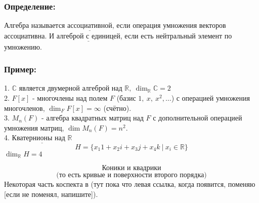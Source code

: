 \documentclass[12pt, letterpaper, twoside]{article}
\newcommand{\Underl}[1]{$\underline{\text{#1}}$}
\newcommand{\mb}[1]{\mathbb{#1}}
\begin{document}
    \subsubsection*{Определение:}
    Алгебра называется \Underl{ассоциативной}, если операция умножения векторов ассоциативна. И \Underl{алгеброй с единицей}, если есть нейтральный элемент по умножению.
    \subsubsection*{Пример:}
    1. $\mb{C}$ является двумерной алгеброй над $\mb{R},\ \dim_{\mb{R}} \mb{C} = 2$\\
    2. $F[x]$ - многочлены над полем $F$ (базис $1,\ x,\ x^2,\dots$) с операцией умножения многочленов, $\dim_{F} F[x] = \infty$ (счётно).\\
    3. $M_n (F)$ - алгебра квадратных матриц над $F$ с дополнительной операцией умножения матриц, $\dim M_n (F) = n^2$.\\
    4. \Underl{Кватернионы над $\mb{R}$}
    \[H = \{ x_1 1 + x_2 i + x_3 j + x_4 k\ \big|\ x_i \in \mb{R} \}\]
    $\dim_{\mb{R}} H = 4$

    \[\text{Коники и квадрики}\]
    \[\text{(то есть кривые и поверхности второго порядка)}\]
    Некоторая часть коспекта в \href{https://www.overleaf.com/learn/latex/Hyperlinks}{} (тут пока что левая ссылка, когда появится, поменяю [если не поменял, напишите]).\\
    
\end{document}
